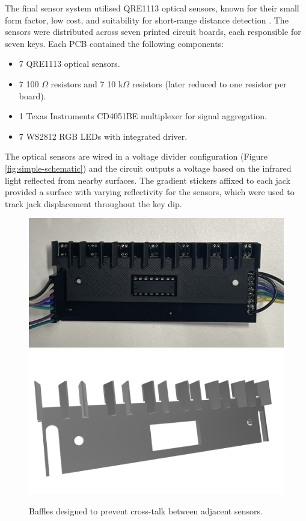 The final sensor system utilised QRE1113 optical sensors, known for their small form factor, low cost, and suitability for short-range distance detection \cite{McPherson2013, McPherson2019}. The sensors were distributed across seven printed circuit boards, each responsible for seven keys. Each PCB contained the following components:

\begin{itemize}
    \item 7 QRE1113 optical sensors.
    \item 7 100 $\Omega$ resistors and 7 10 k$\Omega$ resistors (later reduced to one resistor per board).
    \item 1 Texas Instruments CD4051BE multiplexer for signal aggregation.
    \item 7 WS2812 RGB LEDs with integrated driver.
\end{itemize}

The optical sensors are wired in a voltage divider configuration (Figure \ref{fig:simple-schematic}) and the circuit outputs a voltage based on the infrared light reflected from nearby surfaces. 
The gradient stickers affixed to each jack provided a surface with varying reflectivity for the sensors, which were used to track jack displacement throughout the key dip. 

\begin{figure}[!t]
    \centering
    \includegraphics[width=\linewidth,trim={0 1.5cm 0 1.5cm},clip]{src/images/sensor-board-w-baffles.jpeg}
    \\
    \includegraphics[width=0.8\linewidth,trim={0 2cm 0 2.5cm},clip]{src/images/baffles.png}
    \caption{Baffles designed to prevent cross-talk between adjacent sensors.}
    \Description{}
    \label{fig:baffles}
\end{figure}

